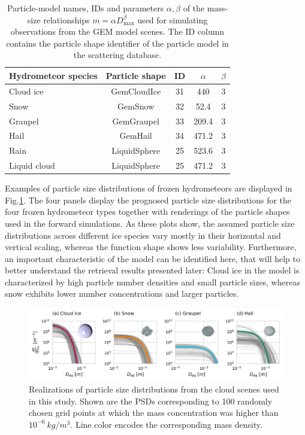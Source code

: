 \documentclass[journal abbreviation, manuscript]{copernicus}
\begin{document}
\begin{table}
  \centering
  \caption{Particle-model names, IDs and parameters $\alpha, \beta$ of the
    mass-size relationships $m = \alpha D_\text{max}^\beta$ used for simulating
    observations from the GEM model scenes. The ID column contains the particle
    shape identifier of the particle model in the \citet{eriksson18} scattering
    database.}
  \label{tab:species_parameters}
  \begin{tabular}{l|c|c|c|c}
    Hydrometeor species & Particle shape & ID & $\alpha$ & $\beta$ \\
    \hline
    Cloud ice    & GemCloudIce  & 31 & 440   & 3 \\
    Snow         & GemSnow      & 32 & 52.4  & 3 \\
    Graupel      & GemGraupel   & 33 & 209.4 & 3 \\
    Hail         & GemHail      & 34 & 471.2 & 3 \\
    Rain         & LiquidSphere & 25 & 523.6 & 3 \\
    Liquid cloud & LiquidSphere & 25 & 471.2 & 3 \\
  \end{tabular}
\end{table}

Examples of particle size distributions of frozen hydrometeors are displayed in
Fig.\ref{fig:gem_psds}. The four panels display the prognosed particle size
distributions for the four frozen hydrometeor types together with renderings of
the particle shapes used in the forward simulations. As these plots show, the
assumed particle size distributions across different ice species vary mostly in
their horizontal and vertical scaling, whereas the function shape shows less
variability. Furthermore, an important characteristic of the model can be
identified here, that will help to better understand the retrieval results
presented later: Cloud ice in the model is characterized by high particle number
densities and small particle sizes, whereas snow exhibits lower number
concentrations and larger particles.


\begin{figure}[h!]
\centering \includegraphics[width = \textwidth]{../plots/gem_hydrometeors.png}
\caption{Realizations of particle size distributions from the cloud scenes used
  in this study. Shown are the PSDs corresponding to 100 randomly chosen grid
  points at which the mass concentration was higher than
  $10^{-6}\ \unit{kg/m^3}$. Line color encodes the corresponding mass density.}
\label{fig:gem_psds}
\end{figure}
\end{document}
